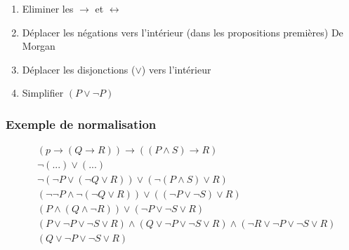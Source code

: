 \begin{enumerate}
\item Eliminer les $\rightarrow$ et $\leftrightarrow$
\item Déplacer les négations vers l'intérieur (dans les propositions premières) De Morgan
\item Déplacer les disjonctions ($\lor$) vers l'intérieur
\item Simplifier $(P \lor \lnot P)$
\end{enumerate}

\subsubsection{Exemple de normalisation}

\begin{align*}
& (p \rightarrow (Q \rightarrow R)) \rightarrow ((P \land S) \rightarrow R) \\
& \lnot ( ... ) \lor ( ... ) \\
& \lnot (\lnot P \lor (\lnot Q \lor R)) \lor (\lnot (P \land S) \lor R) \\
& ( \lnot \lnot P \land \lnot (\lnot Q \lor R)) \lor ((\lnot P \lor \lnot S) \lor R) \\
& (P \land (Q \land \lnot R)) \lor ( \lnot P \lor \lnot S \lor R) \\
& (P \lor \lnot P \lor \lnot S \lor R) \land ( Q \lor \lnot P \lor \lnot S \lor R) \land (\lnot R \lor \lnot P \lor \lnot S \lor R) \\
& (Q \lor \lnot P \lor \lnot S \lor R) 
\end{align*}

